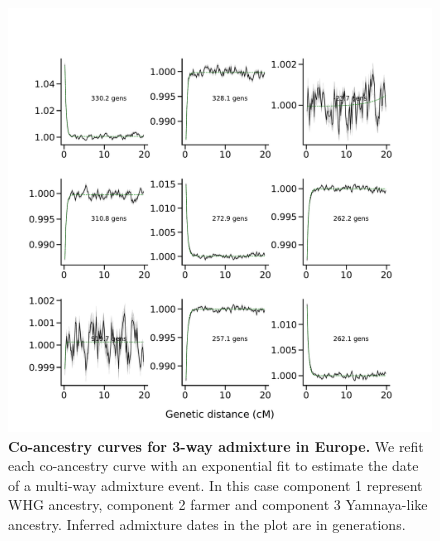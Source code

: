 \begin{figure}
    \centering
    \includegraphics[width=\textwidth]{figures/gbr_onlyancient_cmgrid_nohmm_refitld_curve.pdf}
    \caption{\textbf{Co-ancestry curves for 3-way admixture in Europe.} We refit each co-ancestry curve with an exponential fit to estimate the date of a multi-way admixture event. In this case component 1 represent WHG ancestry, component 2 farmer and component 3 Yamnaya-like ancestry. Inferred admixture dates in the plot are in generations.}
    \label{fig:gb_eur_3way_refit_ldcurve}
\end{figure}

